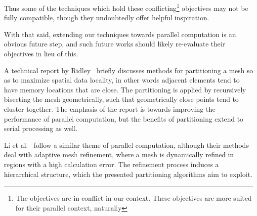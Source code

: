 Thus some of the techniques which hold these conflicting\footnote{The objectives are in conflict in our context. These objectives are more suited for their parallel context, naturally} objectives may not be fully compatible, though they undoubtedly offer helpful inspiration.

With that said, extending our techniques towards parallel computation is an obvious future step, and such future works should likely re-evaluate their objectives in lieu of this.




A technical report by Ridley~\cite{ridley2010guide} briefly discusses methods for partitioning a mesh so as to maximize spatial data locality, in other words adjacent elements tend to have memory locations that are close. The partitioning is applied by recursively bisecting the mesh geometrically, such that geometrically close points tend to cluster together. The emphasis of the report is towards improving the performance of parallel computation, but the benefits of partitioning extend to serial processing as well.




Li et al.~\cite{li2004hierarchical} follow a similar theme of parallel computation, although their methods deal with adaptive mesh refinement, where a mesh is dynamically refined in regions with a high calculation error. The refinement process induces a hierarchical structure, which the presented partitioning algorithms aim to exploit.



